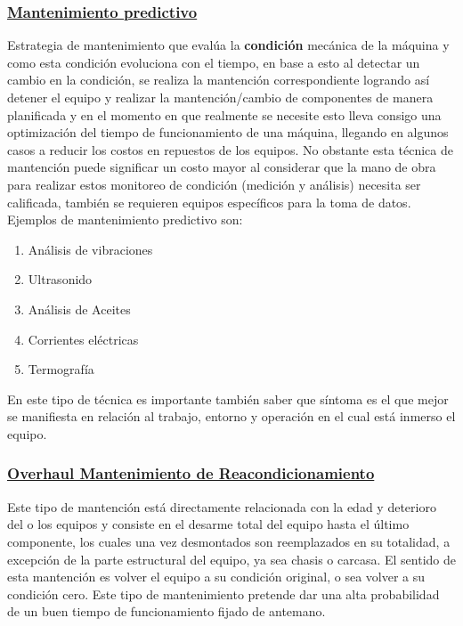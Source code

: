 			\subsubsection{\underline{Mantenimiento predictivo}}
				Estrategia de mantenimiento que evalúa la \textbf{condición} mecánica de la máquina y como esta condición evoluciona con el tiempo, en base a esto al detectar un cambio en la condición, se realiza la mantención correspondiente logrando así detener el equipo y realizar la mantención/cambio de componentes de manera planificada y en el momento en que realmente se necesite esto lleva consigo una optimización del tiempo de funcionamiento de una máquina, llegando en algunos casos a reducir los costos en repuestos de los equipos. No obstante esta técnica de mantención puede significar un costo mayor al considerar que la mano de obra para realizar estos monitoreo de condición (medición y análisis) necesita ser calificada, también se requieren equipos específicos para la toma de datos. Ejemplos de mantenimiento predictivo son:
				\begin{enumerate}
					\item Análisis de vibraciones
					\item Ultrasonido
					\item Análisis de Aceites
					\item Corrientes eléctricas
					\item Termografía
				\end{enumerate}
				En este tipo de técnica es importante también saber que síntoma es el que mejor se manifiesta en relación al trabajo, entorno y operación en el cual está inmerso el equipo.
				
			\subsubsection{\underline{Overhaul Mantenimiento de Reacondicionamiento}}
				Este tipo de mantención está directamente relacionada con la edad y deterioro del o los equipos y consiste en el desarme total del equipo hasta el último componente, los cuales una vez desmontados son reemplazados en su totalidad, a excepción de la parte estructural del equipo, ya sea chasis o carcasa. El sentido de esta mantención es volver el equipo a su condición original, o sea volver a su condición cero. Este tipo de mantenimiento pretende dar una alta probabilidad de un buen tiempo de funcionamiento fijado de antemano.
